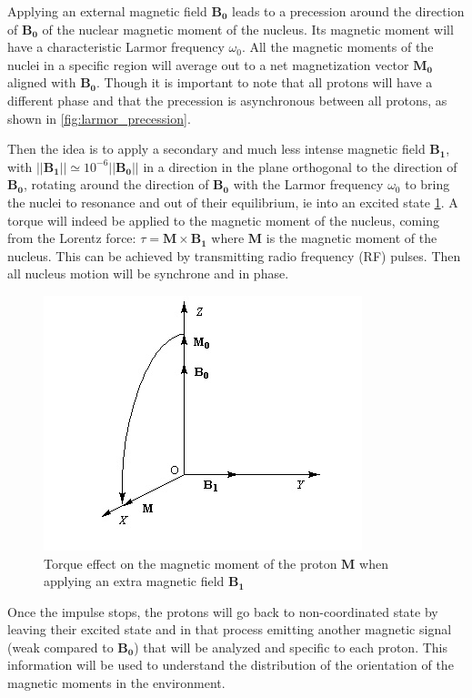 Applying an external magnetic field $\mathbf{B_0}$ leads to a precession around the direction of $\mathbf{B_0}$ of the nuclear magnetic moment of the nucleus. Its magnetic moment will have a characteristic Larmor frequency $\omega_0$. All the magnetic moments of the nuclei in a specific region will average out to a net magnetization vector $\mathbf{M_0}$ aligned with $\mathbf{B_0}$. Though it is important to note that all protons will have a different phase and that the precession is asynchronous between all protons, as shown in \ref{fig:larmor_precession}.

Then the idea is to apply a secondary and much less intense magnetic field $\mathbf{B_1}$, with $||\mathbf{B_1}|| \simeq 10^{-6}||\mathbf{B_0}||$ in a direction in the plane orthogonal to the direction of $\mathbf{B_0}$, rotating around the direction of $\mathbf{B_0}$ with the Larmor frequency $\omega_0$ to bring the nuclei to resonance and out of their equilibrium, ie into an excited state \ref{fig:spin_excitation}. A torque will indeed be applied to the magnetic moment of the nucleus, coming from the Lorentz force: $\tau = \mathbf{M} \times \mathbf{B_1}$ where $\mathbf{M}$ is the magnetic moment of the nucleus. This can be achieved by transmitting radio frequency (RF) pulses. Then all nucleus motion will be synchrone and in phase.

\begin{figure}
    \centering
    \includegraphics[width=.5\textwidth]{figures/spin_excitation}
    \caption{Torque effect on the magnetic moment of the proton $\mathbf{M}$ when applying an extra magnetic field $\mathbf{B_1}$}
    \label{fig:spin_excitation}
\end{figure}

Once the impulse stops, the protons will go back to non-coordinated state by leaving their excited state and in that process emitting another magnetic signal (weak compared to $\mathbf{B_0}$) that will be analyzed and specific to each proton. This information will be used to understand the distribution of the orientation of the magnetic moments in the environment.

